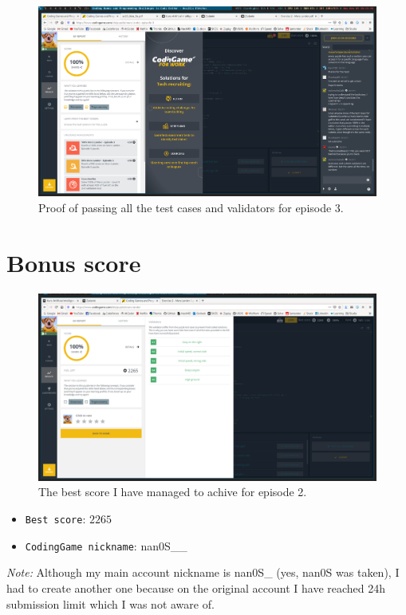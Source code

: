 \documentclass[11pt]{article}
\begin{document}
	 \begin{figure}[h]
 	\centering
	\includegraphics[scale=0.3]{screens/mars-lander-episode3} 	
	\caption{Proof of passing all the test cases and validators for episode 3.}
 	\end{figure}
 	
 	\section{Bonus score}
	\begin{figure}[H]
 	\centering
	\includegraphics[scale=0.3]{screens/mars-lander-episode2-1} 	
	\caption{The best score I have managed to achive for episode 2.}
 	\end{figure}
 	
 	\begin{itemize}
 		\item[] \texttt{Best score}: $2265$
 		\item[] \texttt{CodingGame nickname}: nan0S\_\_
 	\end{itemize}
 	\textit{Note:} Although my main account nickname is nan0S\_ (yes, nan0S was taken), I had to create another one because on the original account I have reached 24h submission limit which I was not aware of.
 	
\end{document}

